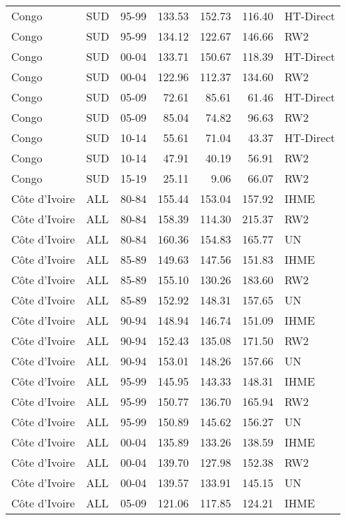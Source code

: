 \begin{longtable}{lllrrrl}
  Congo & SUD & 95-99 & 133.53 & 152.73 & 116.40 & HT-Direct \\ 
  Congo & SUD & 95-99 & 134.12 & 122.67 & 146.66 & RW2 \\ 
  Congo & SUD & 00-04 & 133.71 & 150.67 & 118.39 & HT-Direct \\ 
  Congo & SUD & 00-04 & 122.96 & 112.37 & 134.60 & RW2 \\ 
  Congo & SUD & 05-09 & 72.61 & 85.61 & 61.46 & HT-Direct \\ 
  Congo & SUD & 05-09 & 85.04 & 74.82 & 96.63 & RW2 \\ 
  Congo & SUD & 10-14 & 55.61 & 71.04 & 43.37 & HT-Direct \\ 
  Congo & SUD & 10-14 & 47.91 & 40.19 & 56.91 & RW2 \\ 
  Congo & SUD & 15-19 & 25.11 & 9.06 & 66.07 & RW2 \\ 
  C\^{o}te d'Ivoire & ALL & 80-84 & 155.44 & 153.04 & 157.92 & IHME \\ 
  C\^{o}te d'Ivoire & ALL & 80-84 & 158.39 & 114.30 & 215.37 & RW2 \\ 
  C\^{o}te d'Ivoire & ALL & 80-84 & 160.36 & 154.83 & 165.77 & UN \\ 
  C\^{o}te d'Ivoire & ALL & 85-89 & 149.63 & 147.56 & 151.83 & IHME \\ 
  C\^{o}te d'Ivoire & ALL & 85-89 & 155.10 & 130.26 & 183.60 & RW2 \\ 
  C\^{o}te d'Ivoire & ALL & 85-89 & 152.92 & 148.31 & 157.65 & UN \\ 
  C\^{o}te d'Ivoire & ALL & 90-94 & 148.94 & 146.74 & 151.09 & IHME \\ 
  C\^{o}te d'Ivoire & ALL & 90-94 & 152.43 & 135.08 & 171.50 & RW2 \\ 
  C\^{o}te d'Ivoire & ALL & 90-94 & 153.01 & 148.26 & 157.66 & UN \\ 
  C\^{o}te d'Ivoire & ALL & 95-99 & 145.95 & 143.33 & 148.31 & IHME \\ 
  C\^{o}te d'Ivoire & ALL & 95-99 & 150.77 & 136.70 & 165.94 & RW2 \\ 
  C\^{o}te d'Ivoire & ALL & 95-99 & 150.89 & 145.62 & 156.27 & UN \\ 
  C\^{o}te d'Ivoire & ALL & 00-04 & 135.89 & 133.26 & 138.59 & IHME \\ 
  C\^{o}te d'Ivoire & ALL & 00-04 & 139.70 & 127.98 & 152.38 & RW2 \\ 
  C\^{o}te d'Ivoire & ALL & 00-04 & 139.57 & 133.91 & 145.15 & UN \\ 
  C\^{o}te d'Ivoire & ALL & 05-09 & 121.06 & 117.85 & 124.21 & IHME \\ 

\end{longtable}
